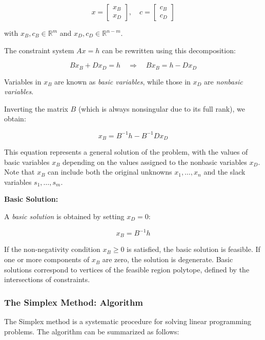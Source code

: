 \documentclass[unicode,11pt,a4paper,oneside,numbers=endperiod,openany]{scrartcl}
\begin{document}
\[
x = \begin{bmatrix}
    x_B \\
    x_D
\end{bmatrix}, \quad
c = \begin{bmatrix}
    c_B \\
    c_D
\end{bmatrix}
\]

with \( x_B, c_B \in \mathbb{R}^{m} \) and \( x_D, c_D \in \mathbb{R}^{n-m} \).

The constraint system \( Ax = h \) can be rewritten using this decomposition:

\[
Bx_B + Dx_D = h \quad \Rightarrow \quad Bx_B = h - Dx_D
\]

Variables in \( x_B \) are known as \textit{basic variables}, while those in \( x_D \) are \textit{nonbasic variables}.

Inverting the matrix \( B \) (which is always nonsingular due to its full rank), we obtain:

\[
x_B = B^{-1}h - B^{-1}Dx_D
\]

This equation represents a general solution of the problem, with the values of basic variables \( x_B \) depending on the values assigned to the nonbasic variables \( x_D \). Note that \( x_B \) can include both the original unknowns \( x_1, \ldots, x_n \) and the slack variables \( s_1, \ldots, s_m \).

\textbf{Basic Solution:}

A \textit{basic solution} is obtained by setting \( x_D = 0 \):

\[
x_B = B^{-1}h
\]

If the non-negativity condition \( x_B \geq 0 \) is satisfied, the basic solution is feasible. If one or more components of \( x_B \) are zero, the solution is degenerate. Basic solutions correspond to vertices of the feasible region polytope, defined by the intersections of constraints.



\subsubsection{The Simplex Method: Algorithm}
The Simplex method is a systematic procedure for solving linear programming problems. The algorithm can be summarized as follows:
\end{document}
